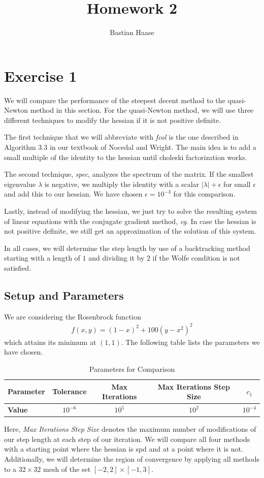 \documentclass{article}
\title{Homework 2}
\author{Bastian Haase}
\date{}
\begin{document}
\maketitle
\section{Exercise 1}
We will compare the performance of the steepest decent method to the quasi-Newton method in this
section. For the quasi-Newton method, we will use three different techniques to modify the
hessian if it is not positive definite.\par
The first technique that we will abbreviate with \emph{fcol} is the one described in Algorithm 3.3
in our textbook of Nocedal and Wright. The main idea is to add a small multiple of the identity to the hessian until choleski factorization works.\par
The second technique, \emph{spec},  analyzes the spectrum of the matrix. If the smallest eigenvalue $\lambda$ is negative,  we  multiply the identity with a scalar $|\lambda|+\epsilon$ for small $\epsilon$ and add this to our hessian.
We have chosen $\epsilon=10^{-3}$ for this comparison.\par
Lastly, instead of modifying the hessian, we just try to solve the resulting system of linear
equations with the conjugate gradient method, \emph{cg}. In case the hessian is not positive definite,
we still get an approximation of the solution of this system. \par
In all cases, we will determine the step length by use of a backtracking method starting with
a length of $1$ and dividing it by $2$ if the Wolfe condition is not satisfied.
\subsection{Setup and Parameters}
We are considering the Rosenbrock function
\begin{align*}
  f(x,y)=(1-x)^2+100(y-x^2)^2
\end{align*}
which attains its minimum at $(1,1)$. The following table lists the parameters we have chosen.
\begin{table}[H]
  \centering
  \begin{tabular}{|l|c|c|c|c|}
    \hline
   \textbf{Parameter} & Tolerance & Max Iterations & Max Iterations Step Size & $c_{1}$ \\ \hline
   \textbf{Value}     & $10^{-6}$   & $10^{5}$ & $10^{2}$ & $10^{-4}$ \\ \hline
  \end{tabular}
  \caption{Parameters for Comparison}
  \label{tab:param}
\end{table}
Here, \emph{Max Iterations Step Size} denotes the maximum number of modifications of our step length at each step
of our iteration.
We will compare all four methods with a starting point where the hessian is spd and at a point where it is not. Additionally, we will determine the region of convergence by applying all methods
to a $32 \times 32$ mesh of the set $[-2,2] \times [-1,3]$.
\end{document}
